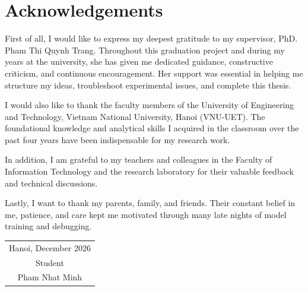 \chapter*{Acknowledgements}

First of all, I would like to express my deepest gratitude to my supervisor, PhD. Pham Thi Quynh Trang. Throughout this graduation project and during my years at the university, she has given me dedicated guidance, constructive criticism, and continuous encouragement. Her support was essential in helping me structure my ideas, troubleshoot experimental issues, and complete this thesis.

I would also like to thank the faculty members of the University of Engineering and Technology, Vietnam National University, Hanoi (VNU-UET). The foundational knowledge and analytical skills I acquired in the classroom over the past four years have been indispensable for my research work.

In addition, I am grateful to my teachers and colleagues in the Faculty of Information Technology and the research laboratory for their valuable feedback and technical discussions.

Lastly, I want to thank my parents, family, and friends. Their constant belief in me, patience, and care kept me motivated through many late nights of model training and debugging.

\vspace{1cm}
\begin{flushright}
\begin{tabular}{@{}c@{}}
Hanoi, December 2026\\
Student\\[1cm]
Pham Nhat Minh
\end{tabular}
\end{flushright}
